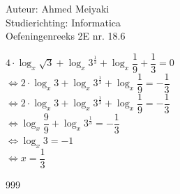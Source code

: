 \documentclass[a4paper]{article}
\begin{document}
  
\noindent \large Auteur: Ahmed Meiyaki \\
\noindent \large Studierichting: Informatica\\
\noindent \large Oefeningenreeks 2E nr. 18.6\\

\medskip

\normalsize

$4 \cdot \log_{x} \sqrt{3} + \log_{x}3^{\tfrac{1}{3}} + \log_{x}\dfrac{1}{9} + \dfrac{1}{3} = 0 $\\

$\Leftrightarrow 2 \cdot \log_{x}3 + \log_{x}3^{\tfrac{1}{3}} + \log_{x}\dfrac{1}{9} = -\dfrac{1}{3} $\\

$\Leftrightarrow 2 \cdot \log_{x}3 + \log_{x}3^{\tfrac{1}{3}} + \log_{x}\dfrac{1}{9} = -\dfrac{1}{3} $\\

$\Leftrightarrow \log_{x}\dfrac{9}{9} + \log_{x}3^{\tfrac{1}{3}} = -\dfrac{1}{3} $\\

$\Leftrightarrow \log_{x}3 = -1 $\\

$\Leftrightarrow x = \dfrac{1}{3} $\\


\begin{thebibliography}{999}
\end{thebibliography}
\end{document}
